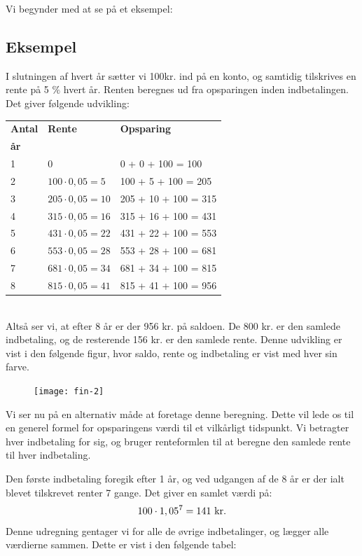 \documentclass[12pt,oneside,a4paper]{article}
\begin{document}
Vi begynder med at se på et eksempel:
\begin{tcolorbox}
\subsection*{Eksempel}
I slutningen af hvert år sætter vi 100kr. ind på en konto, og samtidig
tilskrives en rente på 5 $\%$ hvert år. Renten beregnes ud fra
opsparingen inden indbetalingen.  Det giver følgende udvikling:
\\

\begin{tabular}{|l|l|l|}
    \hline
    \textbf{Antal} & \textbf{Rente} & \textbf{Opsparing} \\
    \textbf{år} &  & \\
    \hline
    1 & 0 & 0 + 0 + 100 = 100 \\
    \hline
    2 & $100\cdot 0,05 = 5$ & 100 + 5 + 100 = 205 \\
    \hline
    3 & $205\cdot 0,05 = 10$ & 205 + 10 + 100 = 315 \\
    \hline
    4 & $315\cdot 0,05 = 16$ & 315 + 16 + 100 = 431 \\
    \hline
    5 & $431\cdot 0,05 = 22$ & 431 + 22 + 100 = 553 \\
    \hline
    6 & $553\cdot 0,05 = 28$ & 553 + 28 + 100 = 681 \\
    \hline
    7 & $681\cdot 0,05 = 34$ & 681 + 34 + 100 = 815 \\
    \hline
    8 & $815\cdot 0,05 = 41$ & 815 + 41 + 100 = 956 \\
    \hline
\end{tabular}
\\

Altså ser vi, at efter 8 år er der 956 kr. på saldoen. De 800 kr. er den
samlede indbetaling, og de resterende 156 kr. er den samlede rente.
Denne udvikling er vist i den følgende figur, hvor saldo, rente og indbetaling er vist med hver sin farve.
\begin{figure}[H]
    \centering
    \texttt{[image: fin-2]}
\end{figure}
\end{tcolorbox}

Vi ser nu på en alternativ måde at foretage denne beregning. Dette vil lede os
til en generel formel for opsparingens værdi til et vilkårligt tidspunkt. Vi
betragter hver indbetaling for sig, og bruger renteformlen til at beregne den
samlede rente til hver indbetaling.

Den første indbetaling foregik efter 1 år, og ved udgangen af de 8 år
er der ialt blevet tilskrevet renter 7 gange.  Det giver en samlet værdi på:
\[
    100\cdot 1,05^7 = 141 {\,\,\rm kr.}
\]
Denne udregning gentager vi for alle de øvrige indbetalinger, og lægger alle
værdierne sammen.  Dette er vist i den følgende tabel:
\\
\end{document}
